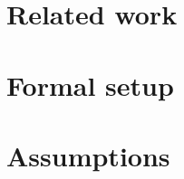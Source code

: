 \documentclass[11pt]{article}
\theoremstyle{definition}
\theoremstyle{plain}
\theoremstyle{remark}
\begin{document}
\section{Related work}

\section{Formal setup}

\section{Assumptions}
\end{document}
